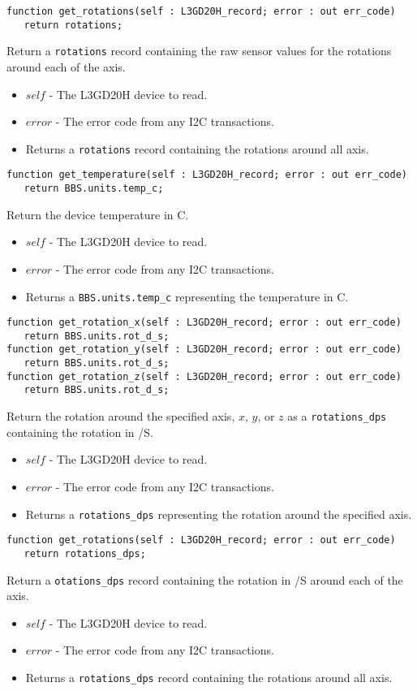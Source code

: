 \documentclass[10pt, openany]{book}
\newcommand{\datatype}[1]{\texttt{#1}}
\begin{document}
\begin{lstlisting}
function get_rotations(self : L3GD20H_record; error : out err_code)
   return rotations;
\end{lstlisting}
Return a \datatype{rotations} record containing the raw sensor values for the rotations around each of the axis.
\begin{itemize}
  \item $self$ - The L3GD20H device to read.
  \item $error$ - The error code from any I2C transactions.
  \item Returns a \datatype{rotations} record containing the rotations around all axis.
\end{itemize}

\begin{lstlisting}
function get_temperature(self : L3GD20H_record; error : out err_code)
   return BBS.units.temp_c;
\end{lstlisting}
Return the device temperature in \degree{}C.
\begin{itemize}
  \item $self$ - The L3GD20H device to read.
  \item $error$ - The error code from any I2C transactions.
  \item Returns a \datatype{BBS.units.temp\_c} representing the temperature in \degree{}C.
\end{itemize}

\begin{lstlisting}
function get_rotation_x(self : L3GD20H_record; error : out err_code)
   return BBS.units.rot_d_s;
function get_rotation_y(self : L3GD20H_record; error : out err_code)
   return BBS.units.rot_d_s;
function get_rotation_z(self : L3GD20H_record; error : out err_code)
   return BBS.units.rot_d_s;
\end{lstlisting}
Return the rotation around the specified axis, $x$, $y$, or $z$ as a \datatype{rotations\_dps} containing the rotation in \degree{}/S.
\begin{itemize}
  \item $self$ - The L3GD20H device to read.
  \item $error$ - The error code from any I2C transactions.
  \item Returns a \datatype{rotations\_dps} representing the rotation around the specified axis.
\end{itemize}

\begin{lstlisting}
function get_rotations(self : L3GD20H_record; error : out err_code)
   return rotations_dps;
\end{lstlisting}
Return a \datatype{otations\_dps} record containing the rotation in \degree{}/S around each of the axis.
\begin{itemize}
  \item $self$ - The L3GD20H device to read.
  \item $error$ - The error code from any I2C transactions.
  \item Returns a \datatype{rotations\_dps} record containing the rotations around all axis.
\end{itemize}
\end{document}
